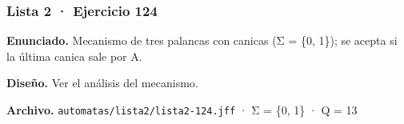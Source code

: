 
\hypertarget{lista-2-ejercicio-124}{%
\subsubsection{Lista 2 · Ejercicio 124}\label{lista-2-ejercicio-124}}

\textbf{Enunciado.} Mecanismo de tres palancas con canicas (Σ = \{0, 1\}); se acepta si la última canica sale por A.

\textbf{Diseño.} Ver el análisis del mecanismo.

\textbf{Archivo.} \texttt{automatas/lista2/lista2-124.jff} · Σ = \{0, 1\} · \textbar Q\textbar{} = 13


